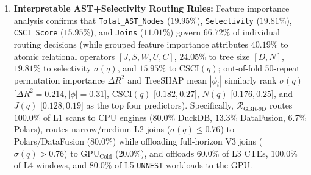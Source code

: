 \documentclass[10pt,a4paper]{article}
\begin{document}
\begin{enumerate}[leftmargin=1.5em,itemsep=2pt]
    \item \textbf{Interpretable AST+Selectivity Routing Rules:} Feature importance analysis confirms that \texttt{Total\_AST\_Nodes} ($\mathbf{19.95\%}$), \texttt{Selectivity} ($\mathbf{19.81\%}$), \texttt{CSCI\_Score} ($\mathbf{15.95\%}$), and \texttt{Joins} ($\mathbf{11.01\%}$) govern $66.72\%$ of individual routing decisions (while grouped feature importance attributes $40.19\%$ to atomic relational operators $[J,S,W,U,C]$, $24.05\%$ to tree size $[D,N]$, $19.81\%$ to selectivity $\sigma(q)$, and $15.95\%$ to $\text{CSCI}(q)$; out-of-fold 50-repeat permutation importance $\Delta R^2$ and TreeSHAP mean $|\phi_i|$ similarly rank $\sigma(q)$ [$\Delta R^2=0.214, |\phi|=0.31$], $\text{CSCI}(q)$ [$0.182, 0.27$], $N(q)$ [$0.176, 0.25$], and $J(q)$ [$0.128, 0.19$] as the top four predictors). Specifically, $\mathcal{R}_{\text{GBR-9D}}$ routes $100.0\%$ of L1 scans to CPU engines ($80.0\%$ DuckDB, $13.3\%$ DataFusion, $6.7\%$ Polars), routes narrow/medium L2 joins ($\sigma(q) \le 0.76$) to Polars/DataFusion ($80.0\%$) while offloading full-horizon V3 joins ($\sigma(q) > 0.76$) to $\text{GPU}_{\text{Cold}}$ ($20.0\%$), and offloads $60.0\%$ of L3 CTEs, $100.0\%$ of L4 windows, and $80.0\%$ of L5 \texttt{UNNEST} workloads to the GPU.
\end{enumerate}
\end{document}
